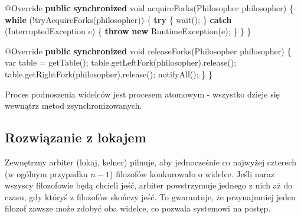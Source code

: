 \documentclass[11pt]{article}
\newenvironment{Shaded}{}{}
\newcommand{\KeywordTok}[1]{\textcolor[rgb]{0.00,0.44,0.13}{\textbf{{#1}}}}
\newcommand{\DataTypeTok}[1]{\textcolor[rgb]{0.56,0.13,0.00}{{#1}}}
\newcommand{\FunctionTok}[1]{\textcolor[rgb]{0.02,0.16,0.49}{{#1}}}
\newcommand{\NormalTok}[1]{{#1}}
\newcommand{\ControlFlowTok}[1]{\textcolor[rgb]{0.00,0.44,0.13}{\textbf{{#1}}}}
\newcommand{\OperatorTok}[1]{\textcolor[rgb]{0.40,0.40,0.40}{{#1}}}
\newcommand{\BuiltInTok}[1]{{#1}}
\newcommand{\AttributeTok}[1]{\textcolor[rgb]{0.49,0.56,0.16}{{#1}}}
\begin{document}
\begin{Shaded}
\begin{Highlighting}[]
    \AttributeTok{@Override}
    \KeywordTok{public} \KeywordTok{synchronized} \DataTypeTok{void} \FunctionTok{acquireForks}\OperatorTok{(}\NormalTok{Philosopher philosopher}\OperatorTok{)} \OperatorTok{\{}
        \ControlFlowTok{while} \OperatorTok{(!}\FunctionTok{tryAcquireForks}\OperatorTok{(}\NormalTok{philosopher}\OperatorTok{))} \OperatorTok{\{}
            \ControlFlowTok{try} \OperatorTok{\{}
                \FunctionTok{wait}\OperatorTok{();}
            \OperatorTok{\}} \ControlFlowTok{catch} \OperatorTok{(}\BuiltInTok{InterruptedException}\NormalTok{ e}\OperatorTok{)} \OperatorTok{\{}
                \ControlFlowTok{throw} \KeywordTok{new} \BuiltInTok{RuntimeException}\OperatorTok{(}\NormalTok{e}\OperatorTok{);}
            \OperatorTok{\}}
        \OperatorTok{\}}
    \OperatorTok{\}}

    \AttributeTok{@Override}
    \KeywordTok{public} \KeywordTok{synchronized} \DataTypeTok{void} \FunctionTok{releaseForks}\OperatorTok{(}\NormalTok{Philosopher philosopher}\OperatorTok{)} \OperatorTok{\{}
        \DataTypeTok{var}\NormalTok{ table }\OperatorTok{=} \FunctionTok{getTable}\OperatorTok{();}
\NormalTok{        table}\OperatorTok{.}\FunctionTok{getLeftFork}\OperatorTok{(}\NormalTok{philosopher}\OperatorTok{).}\FunctionTok{release}\OperatorTok{();}
\NormalTok{        table}\OperatorTok{.}\FunctionTok{getRightFork}\OperatorTok{(}\NormalTok{philosopher}\OperatorTok{).}\FunctionTok{release}\OperatorTok{();}
        \FunctionTok{notifyAll}\OperatorTok{();}
    \OperatorTok{\}}
\OperatorTok{\}}
\end{Highlighting}
\end{Shaded}

Proces podnoszenia widelców jest procesem atomowym - wszystko dzieje się
wewnątrz metod zsynchronizowanych.

    \hypertarget{rozwiux105zanie-z-lokajem}{%
\subsection{Rozwiązanie z lokajem}\label{rozwiux105zanie-z-lokajem}}

Zewnętrzny arbiter (lokaj, kelner) pilnuje, aby jednocześnie co najwyżej
czterech (w ogólnym przypadku \(n - 1\)) filozofów konkurowało o
widelce. Jeśli naraz wszyscy filozofowie będą chcieli jeść, arbiter
powstrzymuje jednego z nich aż do czasu, gdy któryś z filozofów skończy
jeść. To gwarantuje, że przynajmniej jeden filozof zawsze może zdobyć
oba widelce, co pozwala systemowi na postęp.
\end{document}
